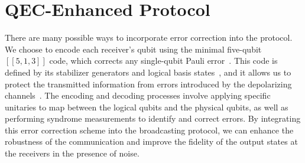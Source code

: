 \documentclass[aps,physrev,10pt,twocolumn,superscriptaddress,floatfix]{revtex4-2}
\begin{document}
\section{QEC-Enhanced Protocol\label{sec:qec}}
There are many possible ways to incorporate error correction into the protocol. We choose to encode each receiver's qubit using the minimal five-qubit $[[5,1,3]]$ code, which corrects any single-qubit Pauli error~\cite{laflamme1996perfect,knill1997theory}. This code is defined by its stabilizer generators and logical basis states~\cite{gottesman1997stabilizer,calderbank1998quantum}, and it allows us to protect the transmitted information from errors introduced by the depolarizing channels~\cite{devitt2013qec}. The encoding and decoding processes involve applying specific unitaries to map between the logical qubits and the physical qubits, as well as performing syndrome measurements to identify and correct errors. By integrating this error correction scheme into the broadcasting protocol, we can enhance the robustness of the communication and improve the fidelity of the output states at the receivers in the presence of noise.
\end{document}
